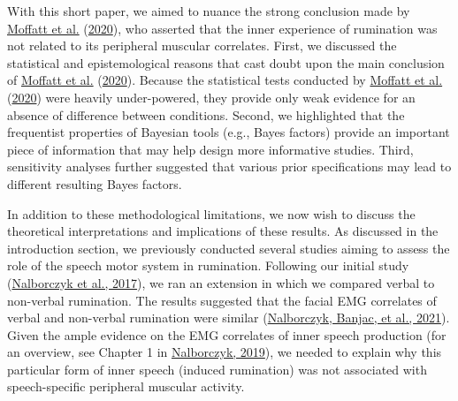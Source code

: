 \documentclass[
  english,
  man, donotrepeattitle,mask,floatsintext]{apa6}
\begin{document}
With this short paper, we aimed to nuance the strong conclusion made by \protect\hyperlink{ref-moffatt_inner_2020}{Moffatt et al.} (\protect\hyperlink{ref-moffatt_inner_2020}{2020}), who asserted that the inner experience of rumination was not related to its peripheral muscular correlates. First, we discussed the statistical and epistemological reasons that cast doubt upon the main conclusion of \protect\hyperlink{ref-moffatt_inner_2020}{Moffatt et al.} (\protect\hyperlink{ref-moffatt_inner_2020}{2020}). Because the statistical tests conducted by \protect\hyperlink{ref-moffatt_inner_2020}{Moffatt et al.} (\protect\hyperlink{ref-moffatt_inner_2020}{2020}) were heavily under-powered, they provide only weak evidence for an absence of difference between conditions. Second, we highlighted that the frequentist properties of Bayesian tools (e.g., Bayes factors) provide an important piece of information that may help design more informative studies. Third, sensitivity analyses further suggested that various prior specifications may lead to different resulting Bayes factors.

In addition to these methodological limitations, we now wish to discuss the theoretical interpretations and implications of these results. As discussed in the introduction section, we previously conducted several studies aiming to assess the role of the speech motor system in rumination. Following our initial study (\protect\hyperlink{ref-nalborczyk_orofacial_2017}{Nalborczyk et al., 2017}), we ran an extension in which we compared verbal to non-verbal rumination. The results suggested that the facial EMG correlates of verbal and non-verbal rumination were similar (\protect\hyperlink{ref-nalborczyk_dissociating_2021}{Nalborczyk, Banjac, et al., 2021}). Given the ample evidence on the EMG correlates of inner speech production (for an overview, see Chapter 1 in \protect\hyperlink{ref-nalborczyk_understanding_2019}{Nalborczyk, 2019}), we needed to explain why this particular form of inner speech (induced rumination) was not associated with speech-specific peripheral muscular activity.
\end{document}
